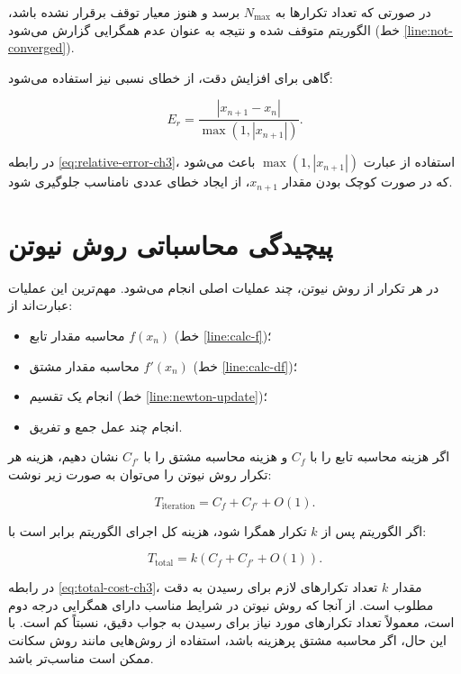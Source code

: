 در صورتی که تعداد تکرارها به \(N_{\max}\) برسد و هنوز معیار توقف برقرار نشده باشد، الگوریتم متوقف شده و نتیجه به عنوان عدم همگرایی گزارش می‌شود (خط \ref{line:not-converged}).

گاهی برای افزایش دقت، از خطای نسبی نیز استفاده می‌شود:

\begin{equation}
E_r=\frac{|x_{n+1}-x_n|}{\max(1,|x_{n+1}|)}.
\label{eq:relative-error-ch3}
\end{equation}

در رابطه \eqref{eq:relative-error-ch3}، استفاده از عبارت \(\max(1,|x_{n+1}|)\) باعث می‌شود که در صورت کوچک بودن مقدار \(x_{n+1}\)، از ایجاد خطای عددی نامناسب جلوگیری شود.

\section{پیچیدگی محاسباتی روش نیوتن}

در هر تکرار از روش نیوتن، چند عملیات اصلی انجام می‌شود. مهم‌ترین این عملیات عبارت‌اند از:

\begin{itemize}
    \item محاسبه مقدار تابع \(f(x_n)\) (خط \ref{line:calc-f})؛
    \item محاسبه مقدار مشتق \(f'(x_n)\) (خط \ref{line:calc-df})؛
    \item انجام یک تقسیم (خط \ref{line:newton-update})؛
    \item انجام چند عمل جمع و تفریق.
\end{itemize}

اگر هزینه محاسبه تابع را با \(C_f\) و هزینه محاسبه مشتق را با \(C_{f'}\) نشان دهیم، هزینه هر تکرار روش نیوتن را می‌توان به صورت زیر نوشت:

\begin{equation}
T_{\mathrm{iteration}}=C_f+C_{f'}+O(1).
\label{eq:iteration-cost-ch3}
\end{equation}

اگر الگوریتم پس از \(k\) تکرار همگرا شود، هزینه کل اجرای الگوریتم برابر است با:

\begin{equation}
T_{\mathrm{total}}=k(C_f+C_{f'}+O(1)).
\label{eq:total-cost-ch3}
\end{equation}

در رابطه \eqref{eq:total-cost-ch3}، مقدار \(k\) تعداد تکرارهای لازم برای رسیدن به دقت مطلوب است. از آنجا که روش نیوتن در شرایط مناسب دارای همگرایی درجه دوم است، معمولاً تعداد تکرارهای مورد نیاز برای رسیدن به جواب دقیق، نسبتاً کم است. با این حال، اگر محاسبه مشتق پرهزینه باشد، استفاده از روش‌هایی مانند روش سکانت ممکن است مناسب‌تر باشد.


